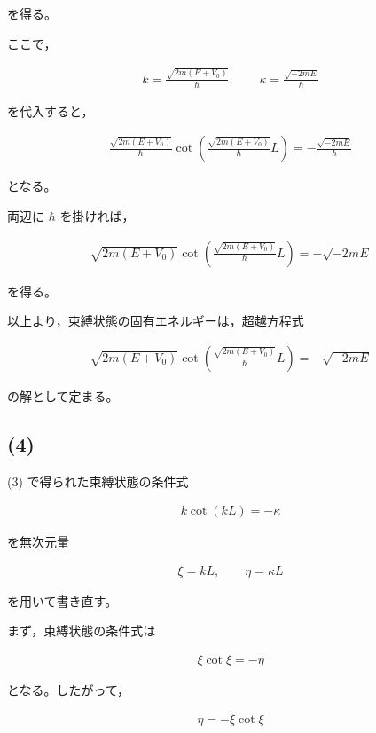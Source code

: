 \documentclass[platex,dvipdfmx,a4paper]{jsarticle}
\begin{document}
を得る。

ここで，

\begin{align*}
k
=
\frac{\sqrt{2m(E+V_0)}}{\hbar},
\qquad
\kappa
=
\frac{\sqrt{-2mE}}{\hbar}
\end{align*}

を代入すると，

\begin{align*}
\frac{\sqrt{2m(E+V_0)}}{\hbar}
\cot\left(
\frac{\sqrt{2m(E+V_0)}}{\hbar}L
\right)
=
-\frac{\sqrt{-2mE}}{\hbar}
\end{align*}

となる。

両辺に $\hbar$ を掛ければ，

\begin{align*}
\sqrt{2m(E+V_0)}
\cot\left(
\frac{\sqrt{2m(E+V_0)}}{\hbar}L
\right)
=
-\sqrt{-2mE}
\end{align*}

を得る。

以上より，束縛状態の固有エネルギーは，超越方程式

\begin{align*}
\sqrt{2m(E+V_0)}
\cot\left(
\frac{\sqrt{2m(E+V_0)}}{\hbar}L
\right)
=
-\sqrt{-2mE}
\end{align*}

の解として定まる。

\subsection*{(4)}

(3) で得られた束縛状態の条件式

\begin{align*}
k\cot(kL)
=
-\kappa
\end{align*}

を無次元量

\begin{align*}
\xi
=
kL,
\qquad
\eta
=
\kappa L
\end{align*}

を用いて書き直す。

まず，束縛状態の条件式は

\begin{align*}
\xi\cot\xi
=
-\eta
\end{align*}

となる。したがって，

\begin{align*}
\eta
=
-\xi\cot\xi
\end{align*}
\end{document}
